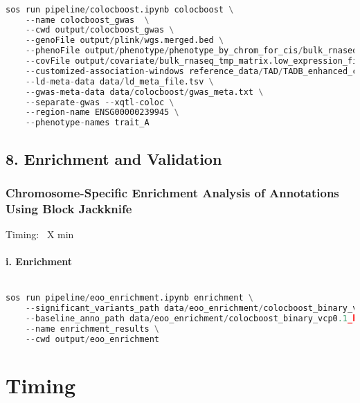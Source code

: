 \documentclass[12pt]{article}
\begin{document}
\noindent
\begin{lstlisting}[language=Python]

sos run pipeline/colocboost.ipynb colocboost \
    --name colocboost_gwas  \
    --cwd output/colocboost_gwas \
    --genoFile output/plink/wgs.merged.bed \
    --phenoFile output/phenotype/phenotype_by_chrom_for_cis/bulk_rnaseq.phenotype_by_chrom_files.region_list.txt \
    --covFile output/covariate/bulk_rnaseq_tmp_matrix.low_expression_filtered.outlier_removed.tmm.expression.covariates.wgs.merged.plink_qc.plink_qc.prune.pca.Marchenko_PC.gz \
    --customized-association-windows reference_data/TAD/TADB_enhanced_cis.bed \
    --ld-meta-data data/ld_meta_file.tsv \
    --gwas-meta-data data/colocboost/gwas_meta.txt \
    --separate-gwas --xqtl-coloc \
    --region-name ENSG00000239945 \
    --phenotype-names trait_A

\end{lstlisting}




\subsection*{8. Enrichment and Validation}


\subsubsection*{Chromosome-Specific Enrichment Analysis of Annotations Using Block Jackknife}
Timing: ~X min

\paragraph*{i. Enrichment}


\noindent
\begin{lstlisting}[language=Python]

sos run pipeline/eoo_enrichment.ipynb enrichment \
    --significant_variants_path data/eoo_enrichment/colocboost_binary_vcp0.1_hg38_annotation.tsv.gz \
    --baseline_anno_path data/eoo_enrichment/colocboost_binary_vcp0.1_hg38_annotation_data.tsv \
    --name enrichment_results \
    --cwd output/eoo_enrichment

\end{lstlisting}





\section*{Timing}
\end{document}
